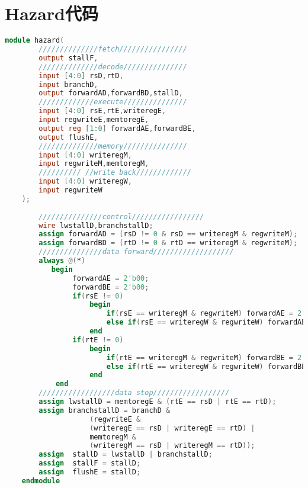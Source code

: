 \section{Hazard代码}
\begin{lstlisting}[language=Verilog]
    module hazard(
        //////////////fetch////////////////
        output stallF,
        //////////////decode///////////////
        input [4:0] rsD,rtD,
        input branchD,
        output forwardAD,forwardBD,stallD,
        /////////////execute///////////////
        input [4:0] rsE,rtE,writeregE,
        input regwriteE,memtoregE,
        output reg [1:0] forwardAE,forwardBE,
        output flushE,
        //////////////memory///////////////
        input [4:0] writeregM,
        input regwriteM,memtoregM,
        ////////// //write back/////////////
        input [4:0] writeregW,
        input regwriteW
    );
        
        ///////////////control/////////////////
        wire lwstallD,branchstallD;
        assign forwardAD = (rsD != 0 & rsD == writeregM & regwriteM);
        assign forwardBD = (rtD != 0 & rtD == writeregM & regwriteM);
        ///////////////data forward///////////////////
        always @(*)
           begin
                forwardAE = 2'b00;
                forwardBE = 2'b00;
                if(rsE != 0) 
                    begin
                        if(rsE == writeregM & regwriteM) forwardAE = 2'b10;
                        else if(rsE == writeregW & regwriteW) forwardAE = 2'b01;
                    end
                if(rtE != 0)
                    begin
                        if(rtE == writeregM & regwriteM) forwardBE = 2'b10;
                        else if(rtE == writeregW & regwriteW) forwardBE = 2'b01;
                    end
            end
        //////////////////data stop//////////////////
        assign lwstallD = memtoregE & (rtE == rsD | rtE == rtD);
        assign branchstallD = branchD &
                    (regwriteE & 
                    (writeregE == rsD | writeregE == rtD) |
                    memtoregM &
                    (writeregM == rsD | writeregM == rtD));
        assign  stallD = lwstallD | branchstallD;
        assign  stallF = stallD;
        assign  flushE = stallD;
    endmodule
\end{lstlisting}

